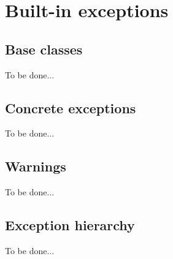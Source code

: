 \section{Built-in exceptions}
\subsection{Base classes}
To be done...

\subsection{Concrete exceptions}
To be done...

\subsection{Warnings}
To be done...

\subsection{Exception hierarchy}
To be done...

%